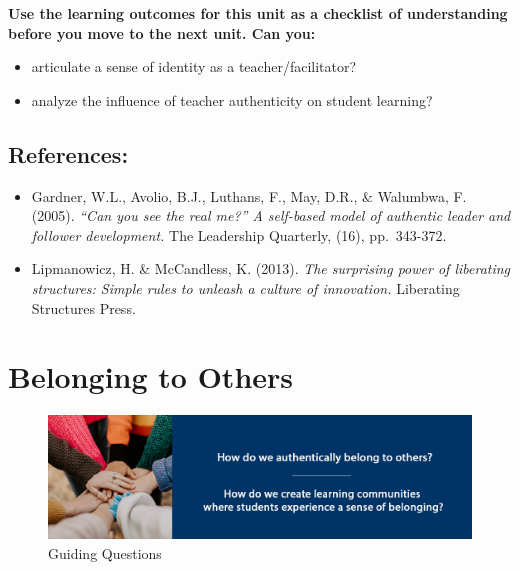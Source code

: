 \documentclass[
]{book}
\providecommand{\tightlist}{%
  \setlength{\itemsep}{0pt}\setlength{\parskip}{0pt}}
\begin{document}
\begin{progress}
\textbf{Use the learning outcomes for this unit as a checklist of
understanding before you move to the next unit. Can you:}

\begin{itemize}
\tightlist
\item
  articulate a sense of identity as a teacher/facilitator?
\item
  analyze the influence of teacher authenticity on student learning?
\end{itemize}
\end{progress}

\hypertarget{references}{%
\section*{References:}\label{references}}

\begin{itemize}
\tightlist
\item
  Gardner, W.L., Avolio, B.J., Luthans, F., May, D.R., \& Walumbwa, F. (2005). \emph{``Can you see the real me?'' A self-based model of authentic leader and follower development.} The Leadership Quarterly, (16), pp.~343-372.\\
\item
  Lipmanowicz, H. \& McCandless, K. (2013). \emph{The surprising power of liberating structures: Simple rules to unleash a culture of innovation.} Liberating Structures Press.
\end{itemize}

\hypertarget{belonging-to-others}{%
\chapter{Belonging to Others}\label{belonging-to-others}}

\begin{figure}
\centering
\includegraphics{assets/unit3/LDRS664-BannerUnit3.jpg}
\caption{Guiding Questions}
\end{figure}
\end{document}
